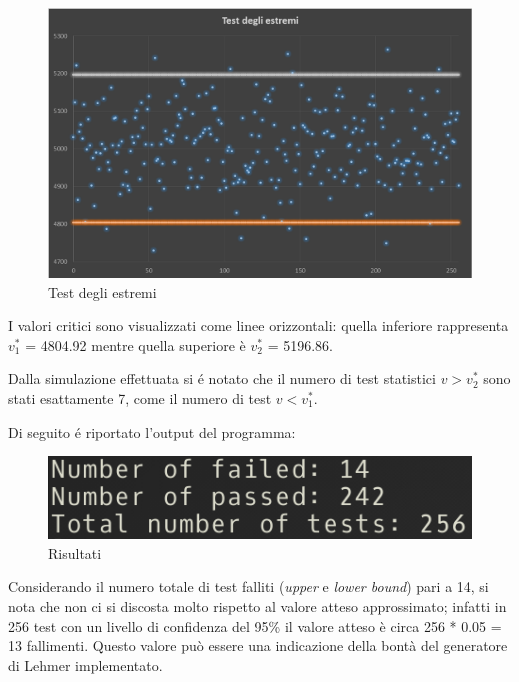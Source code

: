 \begin{figure}[H]
 \begin{center}
  \includegraphics[scale=0.45]{img/test.png}
  \caption[Test degli estremi]{Test degli estremi}
  \end{center}
\end{figure}

\vspace{0.5cm}
I valori critici sono visualizzati come linee orizzontali: quella inferiore rappresenta
$v_1^{*}$ = 4804.92 mentre quella superiore è $v_2^{*}$ = 5196.86.

Dalla simulazione effettuata si \'e notato che il numero di test statistici $v > v_2^{*}$ sono stati esattamente 7, come il numero di test $v < v_1^{*}$.

\vspace{0.5cm}
Di seguito \'e riportato l'output del programma:

\begin{figure}[H]
  \begin{center}
  \includegraphics[scale=0.7]{img/test_estremi.png}
  \caption[Risultati]{Risultati}
  \end{center}
\end{figure}


Considerando il numero totale di test falliti (\textit{upper} e \textit{lower bound}) pari a 14, si nota che non
ci si discosta molto rispetto al valore atteso approssimato; infatti in 256 test con un livello di
confidenza del 95\% il valore atteso è circa 256 * 0.05 = 13 fallimenti. Questo valore pu\`o 
essere una indicazione della bont\`a del generatore di Lehmer implementato.
